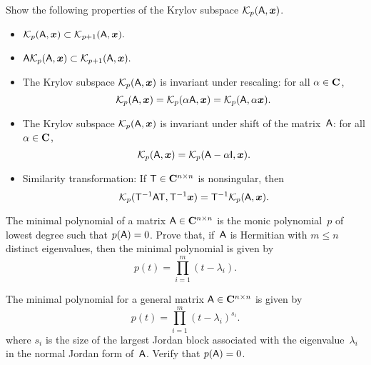 \begin{exercise}
    Show the following properties of the Krylov subspace $\mathcal K_p(\mathsf A, \mathbf{\boldsymbol{x}})$.
    \begin{itemize}
        \item
            \(
                \mathcal K_p(\mathsf A, \mathbf{\boldsymbol{x}}) \subset \mathcal K_{p+1}(\mathsf A, \mathbf{\boldsymbol{x}}).
            \)

        \item
            \(
                \mathsf A \mathcal K_p(\mathsf A, \mathbf{\boldsymbol{x}}) \subset \mathcal K_{p+1}(\mathsf A, \mathbf{\boldsymbol{x}}).
            \)

        \item
            The Krylov subspace $\mathcal K_p(\mathsf A, \mathbf{\boldsymbol{x}})$ is invariant under rescaling:
            for all $\alpha \in \mathbf C$,
            \[
                \mathcal K_p(\mathsf A, \mathbf{\boldsymbol{x}}) = \mathcal K_p(\alpha \mathsf A, \mathbf{\boldsymbol{x}}) = \mathcal K_p(\mathsf A, \alpha \mathbf{\boldsymbol{x}}).
            \]

        \item
            The Krylov subspace $\mathcal K_p(\mathsf A, \mathbf{\boldsymbol{x}})$ is invariant under shift of the matrix~$\mathsf A$:
            for all $\alpha \in \mathbf C$,
            \[
                \mathcal K_p(\mathsf A, \mathbf{\boldsymbol{x}}) = \mathcal K_p(\mathsf A - \alpha \mathsf I, \mathbf{\boldsymbol{x}}).
            \]

        \item
            Similarity transformation: If $\mathsf T \in \mathbf C^{n \times n}$ is nonsingular,
            then
            \[
                \mathcal K_p(\mathsf T^{-1} \mathsf A \mathsf T, \mathsf T^{-1} \mathbf{\boldsymbol{x}}) =
                \mathsf T^{-1} \mathcal K_p(\mathsf A, \mathbf{\boldsymbol{x}}).
            \]
    \end{itemize}
\end{exercise}

\begin{exercise}
    The minimal polynomial of a matrix $\mathsf A \in \mathbf C^{n \times n}$ is the monic polynomial~$p$ of lowest degree such that $p(\mathsf A) = 0$.
    Prove that, if~$\mathsf A$ is Hermitian with $m \leq n$ distinct eigenvalues,
    then the minimal polynomial is given by
    \[
        p(t) = \prod_{i=1}^m (t - \lambda_i).
    \]
\end{exercise}

\begin{exercise}
    The minimal polynomial for a general matrix $\mathsf A \in \mathbf C^{n \times n}$ is given by
    \[
        p(t) = \prod_{i=1}^m (t - \lambda_i)^{s_i}.
    \]
    where $s_i$ is the size of the largest Jordan block associated with the eigenvalue~$\lambda_i$ in the normal Jordan form of~$\mathsf A$.
    Verify that $p(\mathsf A) = 0$.
\end{exercise}

